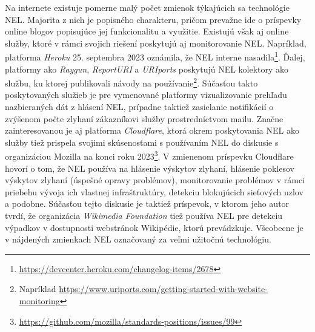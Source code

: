 Na internete existuje pomerne malý počet zmienok týkajúcich sa technológie NEL.
Majorita z nich je popisného charakteru, pričom prevažne ide o príspevky online blogov popisujúce jej funkcionalitu a využitie.
Existujú však aj online služby, ktoré v rámci svojich riešení poskytujú aj monitorovanie NEL.
Napríklad, platforma \emph{Heroku} 25. septembra 2023 oznámila, že NEL interne nasadila\footnote{\url{https://devcenter.heroku.com/changelog-items/2678}}.
Ďalej, platformy ako \emph{Raygun}, \emph{ReportURI} a \emph{URIports} poskytujú NEL kolektory ako službu, ku ktorej publikovali návody na používanie\footnote{Napríklad \url{https://www.uriports.com/getting-started-with-website-monitoring}}.
Súčasťou takto poskytovaných služieb je pre vymenované platformy vizualizovanie prehľadu nazbieraných dát z hlásení NEL, prípadne taktiež zasielanie notifikácií o zvýšenom počte zlyhaní zákazníkovi služby prostredníctvom mailu.
Značne zainteresovanou je aj platforma \emph{Cloudflare}, ktorá okrem poskytovania NEL ako služby tiež prispela svojimi skúsenosťami s používaním NEL do diskusie s organizáciou Mozilla na konci roku 2023\footnote{\url{https://github.com/mozilla/standards-positions/issues/99}}.
V zmienenom príspevku Cloudflare hovorí o tom, že NEL používa na hlásenie výskytov zlyhaní, hlásenie poklesov výskytov zlyhaní (úspešné opravy problémov), monitorovanie problémov v rámci priebehu vývoja ich vlastnej infraštruktúry, detekciu blokujúcich sieťových uzlov a podobne.
Súčasťou tejto diskusie je taktiež príspevok, v ktorom jeho autor tvrdí, že organizácia \emph{Wikimedia Foundation} tiež používa NEL pre detekciu výpadkov v dostupnosti webstránok Wikipédie, ktorú prevádzkuje. 
Všeobecne je v nájdených zmienkach NEL označovaný za veľmi užitočnú technológiu.